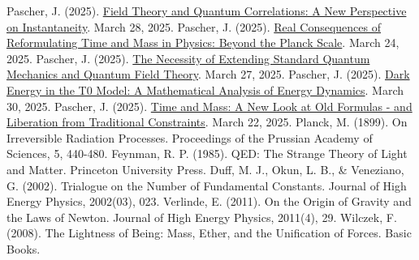 \documentclass[12pt,a4paper]{article}
\begin{document}
\begin{thebibliography}{99}
		 Pascher, J. (2025). \href{https://github.com/jpascher/T0-Time-Mass-Duality/tree/main/2/pdf/English/FeldtheorieQuantenEn.pdf}{Field Theory and Quantum Correlations: A New Perspective on Instantaneity}. March 28, 2025.
		 Pascher, J. (2025). \href{https://github.com/jpascher/T0-Time-Mass-Duality/tree/main/2/pdf/English/JenseitsPlanckEn.pdf}{Real Consequences of Reformulating Time and Mass in Physics: Beyond the Planck Scale}. March 24, 2025.
		 Pascher, J. (2025). \href{https://github.com/jpascher/T0-Time-Mass-Duality/tree/main/2/pdf/English/NotwendigkeitQMErweiterungEn.pdf}{The Necessity of Extending Standard Quantum Mechanics and Quantum Field Theory}. March 27, 2025.
		 Pascher, J. (2025). \href{https://github.com/jpascher/T0-Time-Mass-Duality/tree/main/2/pdf/English/MathEnergiedynamikEn.pdf}{Dark Energy in the T0 Model: A Mathematical Analysis of Energy Dynamics}. March 30, 2025.
		 Pascher, J. (2025). \href{https://github.com/jpascher/T0-Time-Mass-Duality/tree/main/2/pdf/English/ZeitMasseNeuerBlickEn.pdf}{Time and Mass: A New Look at Old Formulas - and Liberation from Traditional Constraints}. March 22, 2025.
		 Planck, M. (1899). On Irreversible Radiation Processes. Proceedings of the Prussian Academy of Sciences, 5, 440-480.
		 Feynman, R. P. (1985). QED: The Strange Theory of Light and Matter. Princeton University Press.
		 Duff, M. J., Okun, L. B., \& Veneziano, G. (2002). Trialogue on the Number of Fundamental Constants. Journal of High Energy Physics, 2002(03), 023.
		 Verlinde, E. (2011). On the Origin of Gravity and the Laws of Newton. Journal of High Energy Physics, 2011(4), 29.
		 Wilczek, F. (2008). The Lightness of Being: Mass, Ether, and the Unification of Forces. Basic Books.
	\end{thebibliography}
	
\end{document}
